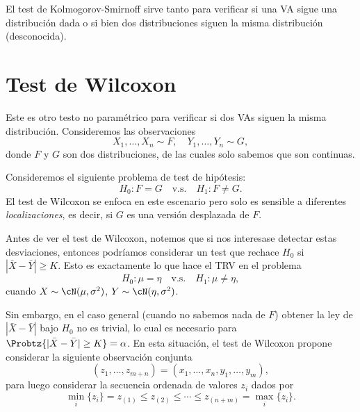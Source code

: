 \begin{remark}
El test de  Kolmogorov-Smirnoff sirve tanto para verificar si una VA sigue una distribución dada o si bien dos distribuciones siguen la misma distribución (desconocida).
\end{remark}

 \section{Test de Wilcoxon} 
\label{sub:test_Wilc}

Este es otro testo no paramétrico para verificar si dos VAs siguen la misma distribución. Consideremos las observaciones 
\begin{equation}
	X_1,\ldots,X_n\sim F,\quad Y_1,\ldots,Y_n\sim G,
\end{equation}
donde $F$ y $G$ son dos distribuciones, de las cuales solo sabemos que son continuas. 

Consideremos el siguiente problema de test de hipótesis: 
	\begin{equation}
		H_0:F=G\quad \text{v.s.}\quad H_1:F\neq G.
	\end{equation}
El test de Wilcoxon se enfoca en este escenario pero solo es sensible a diferentes \emph{localizaciones}, es decir, si $G$ es una versión desplazada de $F$.

Antes de ver el test de Wilcoxon, notemos que si nos interesase detectar estas desviaciones, entonces podríamos considerar un test que rechace $H_0$ si $|\bar{X} - \bar{Y}|\geq K$. Esto  es exactamente lo que hace el TRV en el problema 
	\begin{equation}
		H_0:\mu =  \eta \quad \text{v.s.}\quad H_1:\mu\neq \eta,
	\end{equation}
cuando $X\sim\cN(\mu,\sigma^2)$,  $Y\sim\cN(\eta,\sigma^2)$.

Sin embargo, en el caso general (cuando no sabemos nada de $F$) obtener la ley de $|\bar{X} - \bar{Y}|$ bajo $H_0$ no es trivial, lo cual es necesario para $\Probtz{|\bar{X} - \bar{Y}|\geq K} = \alpha$. En esta situación, el test de Wilcoxon propone considerar la siguiente observación conjunta 
\begin{equation}
	(z_1,\ldots,z_{m+n}) = (x_1,\ldots,x_n,y_1,\ldots,y_m),
\end{equation}
para luego considerar la secuencia ordenada de valores $z_i$ dados por 
\begin{equation}
	\min_i\{z_i\} = z_{(1)}\leq z_{(2)}\leq\cdots\leq z_{(n+m)} = \max_i\{z_i\}.
\end{equation}

